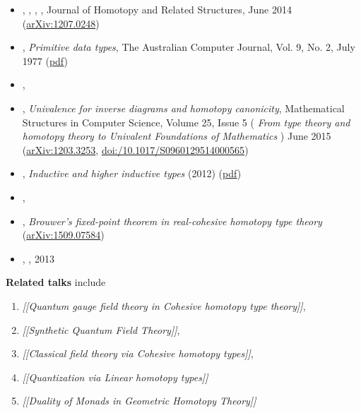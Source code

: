 \documentclass[12pt,titlepage]{article}
\theoremstyle{plain}
\theoremstyle{definition}
\theoremstyle{remark}
\begin{document}
\begin{itemize}
\item {}, , , , Journal of Homotopy and Related Structures, June 2014 (\href{http://arxiv.org/abs/1207.0248}{arXiv:1207.0248})
\item {}, \emph{Primitive data types}, The Australian Computer Journal, Vol. 9, No. 2, July 1977 (\href{http://eprints.utas.edu.au/139/1/PrimitiveData.pdf}{pdf})
\item {}, 
\item {}, \emph{Univalence for inverse diagrams and homotopy canonicity}, Mathematical Structures in Computer Science, Volume 25, Issue 5 ( \emph{From type theory and homotopy theory to Univalent Foundations of Mathematics} ) June 2015 (\href{https://arxiv.org/abs/1203.3253}{arXiv:1203.3253}, \href{https://doi.org/10.1017/S0960129514000565}{doi:/10.1017/S0960129514000565})
\item {}, \emph{Inductive and higher inductive types} (2012) (\href{http://www.math.ias.edu/~mshulman/hottminicourse2012/04induction.pdf}{pdf})
\item {}, 
\item {}, \emph{Brouwer's fixed-point theorem in real-cohesive homotopy type theory} (\href{http://arxiv.org/abs/1509.07584}{arXiv:1509.07584})
\item {}, , 2013
\end{itemize}

\textbf{Related talks} include
\begin{enumerate}%
\item \emph{[[Quantum gauge field theory in Cohesive homotopy type theory]]},
\item \emph{[[Synthetic Quantum Field Theory]]},
\item \emph{[[Classical field theory via Cohesive homotopy types]]},
\item \emph{[[Quantization via Linear homotopy types]]}
\item \emph{[[Duality of Monads in Geometric Homotopy Theory]]}
\end{enumerate}
\end{document}
